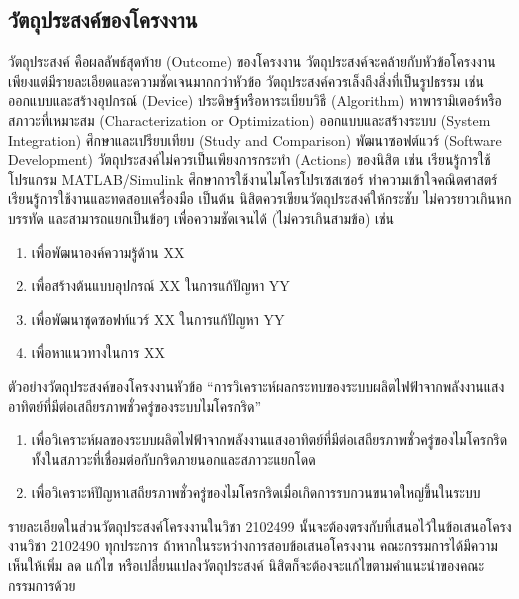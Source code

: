 \documentclass[11pt,a4paper]{article}
\begin{document}
\subsection{วัตถุประสงค์ของโครงงาน}
วัตถุประสงค์ คือผลลัพธ์สุดท้าย (Outcome) ของโครงงาน วัตถุประสงค์จะคล้ายกับหัวข้อโครงงาน เพียงแต่มีรายละเอียดและความชัดเจนมากกว่าหัวข้อ วัตถุประสงค์ควรเล็งถึงสิ่งที่เป็นรูปธรรม เช่น ออกแบบและสร้างอุปกรณ์ (Device) ประดิษฐ์หรือหาระเบียบวิธี (Algorithm) หาพารามิเตอร์หรือสภาวะที่เหมาะสม (Characterization or Optimization) ออกแบบและสร้างระบบ (System Integration) ศึกษาและเปรียบเทียบ (Study and Comparison) พัฒนาซอฟต์แวร์ (Software Development) วัตถุประสงค์ไม่ควรเป็นเพียงการกระทำ (Actions) ของนิสิต เช่น เรียนรู้การใช้โปรแกรม MATLAB/Simulink ศึกษาการใช้งานไมโครโปรเซสเซอร์ ทำความเข้าใจคณิตศาสตร์ เรียนรู้การใช้งานและทดสอบเครื่องมือ เป็นต้น นิสิตควรเขียนวัตถุประสงค์ให้กระชับ ไม่ควรยาวเกินหกบรรทัด และสามารถแยกเป็นข้อๆ เพื่อความชัดเจนได้ (ไม่ควรเกินสามข้อ) เช่น
\begin{enumerate}
\item เพื่อพัฒนาองค์ความรู้ด้าน XX 
\item เพื่อสร้างต้นแบบอุปกรณ์ XX ในการแก้ปัญหา YY
\item เพื่อพัฒนาชุดซอฟท์แวร์ XX ในการแก้ปัญหา YY 
\item เพื่อหาแนวทางในการ XX
\end{enumerate}

ตัวอย่างวัตถุประสงค์ของโครงงานหัวข้อ “การวิเคราะห์ผลกระทบของระบบผลิตไฟฟ้าจากพลังงานแสงอาทิตย์ที่มีต่อเสถียรภาพชั่วครู่ของระบบไมโครกริด”
\begin{enumerate}
    \item เพื่อวิเคราะห์ผลของระบบผลิตไฟฟ้าจากพลังงานแสงอาทิตย์ที่มีต่อเสถียรภาพชั่วครู่ของไมโครกริด ทั้งในสภาวะที่เชื่อมต่อกับกริดภายนอกและสภาวะแยกโดด
    \item เพื่อวิเคราะห์ปัญหาเสถียรภาพชั่วครู่ของไมโครกริดเมื่อเกิดการรบกวนขนาดใหญ่ขึ้นในระบบ
\end{enumerate}

รายละเอียดในส่วนวัตถุประสงค์โครงงานในวิชา 2102499 นั้นจะต้องตรงกับที่เสนอไว้ในข้อเสนอโครงงานวิชา 2102490 ทุกประการ ถ้าหากในระหว่างการสอบข้อเสนอโครงงาน คณะกรรมการได้มีความเห็นให้เพิ่ม ลด แก้ไข หรือเปลี่ยนแปลงวัตถุประสงค์ นิสิตก็จะต้องจะแก้ไขตามคำแนะนำของคณะกรรมการด้วย
\end{document}
